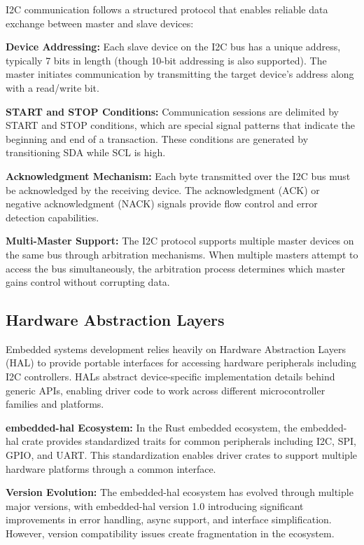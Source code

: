 I2C communication follows a structured protocol that enables reliable data exchange between master and slave devices:

\textbf{Device Addressing:} Each slave device on the I2C bus has a unique address, typically 7 bits in length (though 10-bit addressing is also supported). The master initiates communication by transmitting the target device's address along with a read/write bit.

\textbf{START and STOP Conditions:} Communication sessions are delimited by START and STOP conditions, which are special signal patterns that indicate the beginning and end of a transaction. These conditions are generated by transitioning SDA while SCL is high.

\textbf{Acknowledgment Mechanism:} Each byte transmitted over the I2C bus must be acknowledged by the receiving device. The acknowledgment (ACK) or negative acknowledgment (NACK) signals provide flow control and error detection capabilities.

\textbf{Multi-Master Support:} The I2C protocol supports multiple master devices on the same bus through arbitration mechanisms. When multiple masters attempt to access the bus simultaneously, the arbitration process determines which master gains control without corrupting data.

\subsection{Hardware Abstraction Layers}
\label{subsec:hal-embedded}

Embedded systems development relies heavily on Hardware Abstraction Layers (HAL) to provide portable interfaces for accessing hardware peripherals including I2C controllers\cite{embedded_hal}. HALs abstract device-specific implementation details behind generic APIs, enabling driver code to work across different microcontroller families and platforms.

\textbf{embedded-hal Ecosystem:} In the Rust embedded ecosystem, the embedded-hal crate provides standardized traits for common peripherals including I2C, SPI, GPIO, and UART. This standardization enables driver crates to support multiple hardware platforms through a common interface.

\textbf{Version Evolution:} The embedded-hal ecosystem has evolved through multiple major versions, with embedded-hal version 1.0 introducing significant improvements in error handling, async support, and interface simplification. However, version compatibility issues create fragmentation in the ecosystem.

